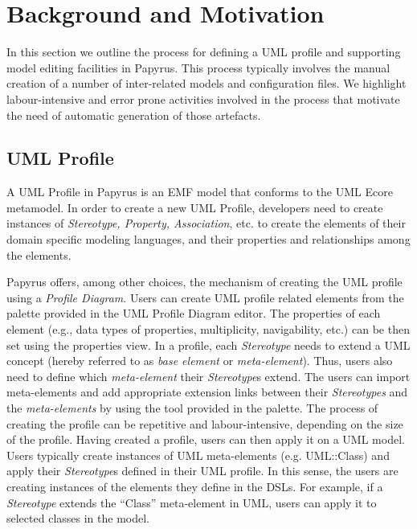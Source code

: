 \section{Background and Motivation}
\label{sec:background}

In this section we outline the process for defining a UML profile and supporting model editing facilities in Papyrus. 
This process typically involves the manual creation of a number of inter-related models and configuration files.
We highlight labour-intensive and error prone activities involved in the process that motivate the need of automatic generation of those artefacts.

\subsection{UML Profile}
A UML Profile in Papyrus is an EMF model that conforms to the UML Ecore metamodel. 
In order to create a new UML Profile, developers need to create instances of \textit{Stereotype, Property, Association}, etc. to create the elements of their domain specific modeling languages, and their properties and relationships among the elements.

Papyrus offers, among other choices, the mechanism of creating the UML profile using a \textit{Profile Diagram}. 
Users can create UML profile related elements from the palette provided in the UML Profile Diagram editor.
The properties of each element (e.g., data types of properties, multiplicity, navigability, etc.) can be then set using the properties view. 
In a profile, each \textit{Stereotype} needs to extend a UML concept (hereby referred to as \textit{base element} or \textit{meta-element}). 
Thus, users also need to define which \textit{meta-element} their \textit{Stereotype}s extend. 
The users can import meta-elements and add appropriate extension links between their \textit{Stereotypes} and the \textit{meta-elements} by using the tool provided in the palette.
The process of creating the profile can be repetitive and labour-intensive, depending on the size of the profile.
Having created a profile, users can then apply it on a UML model. 
Users typically create instances of UML meta-elements (e.g. UML::Class) and apply their \textit{Stereotype}s defined in their UML profile. In this sense, the users are creating instances of the elements they define in the DSLs. 
For example, if a \textit{Stereotype} extends the ``Class'' meta-element in UML, users can apply it to selected classes in the model. 

